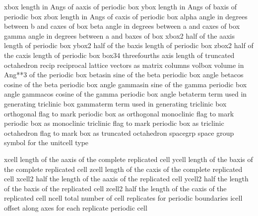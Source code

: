 \documentclass[letterpaper,11pt,english]{sphinxmanual}
\begin{document}

\begin{sphinxVerbatim}[commandchars=\\\{\}]
xbox            length in Angs of a\PYGZhy{}axis of periodic box
ybox            length in Angs of b\PYGZhy{}axis of periodic box
zbox            length in Angs of c\PYGZhy{}axis of periodic box
alpha           angle in degrees between b\PYGZhy{} and c\PYGZhy{}axes of box
beta            angle in degrees between a\PYGZhy{} and c\PYGZhy{}axes of box
gamma           angle in degrees between a\PYGZhy{} and b\PYGZhy{}axes of box
xbox2           half of the a\PYGZhy{}axis length of periodic box
ybox2           half of the b\PYGZhy{}axis length of periodic box
zbox2           half of the c\PYGZhy{}axis length of periodic box
box34           three\PYGZhy{}fourths axis length of truncated octahedron
recip           reciprocal lattice vectors as matrix columns
volbox          volume in Ang**3 of the periodic box
beta\PYGZus{}sin        sine of the beta periodic box angle
beta\PYGZus{}cos        cosine of the beta periodic box angle
gamma\PYGZus{}sin       sine of the gamma periodic box angle
gamma\PYGZus{}cos       cosine of the gamma periodic box angle
beta\PYGZus{}term       term used in generating triclinic box
gamma\PYGZus{}term      term used in generating triclinic box
orthogonal      flag to mark periodic box as orthogonal
monoclinic      flag to mark periodic box as monoclinic
triclinic       flag to mark periodic box as triclinic
octahedron      flag to mark box as truncated octahedron
spacegrp        space group symbol for the unitcell type
\end{sphinxVerbatim}


\begin{sphinxVerbatim}[commandchars=\\\{\}]
xcell           length of the a\PYGZhy{}axis of the complete replicated cell
ycell           length of the b\PYGZhy{}axis of the complete replicated cell
zcell           length of the c\PYGZhy{}axis of the complete replicated cell
xcell2          half the length of the a\PYGZhy{}axis of the replicated cell
ycell2          half the length of the b\PYGZhy{}axis of the replicated cell
zcell2          half the length of the c\PYGZhy{}axis of the replicated cell
ncell           total number of cell replicates for periodic boundaries
icell           offset along axes for each replicate periodic cell
\end{sphinxVerbatim}
\end{document}
